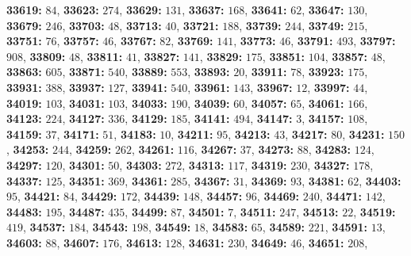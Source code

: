 \textsf{\bfseries 33619:} $84$, \textsf{\bfseries 33623:} $274$, \textsf{\bfseries 33629:} $131$, \textsf{\bfseries 33637:} $168$, \textsf{\bfseries 33641:} $62$, \textsf{\bfseries 33647:} $130$, \textsf{\bfseries 33679:} $246$, \textsf{\bfseries 33703:} $48$, \textsf{\bfseries 33713:} $40$, \textsf{\bfseries 33721:} $188$, \textsf{\bfseries 33739:} $244$, \textsf{\bfseries 33749:} $215$, \textsf{\bfseries 33751:} $76$, \textsf{\bfseries 33757:} $46$, \textsf{\bfseries 33767:} $82$, \textsf{\bfseries 33769:} $141$, \textsf{\bfseries 33773:} $46$, \textsf{\bfseries 33791:} $493$, \textsf{\bfseries 33797:} $908$, \textsf{\bfseries 33809:} $48$, \textsf{\bfseries 33811:} $41$, \textsf{\bfseries 33827:} $141$, \textsf{\bfseries 33829:} $175$, \textsf{\bfseries 33851:} $104$, \textsf{\bfseries 33857:} $48$, \textsf{\bfseries 33863:} $605$, \textsf{\bfseries 33871:} $540$, \textsf{\bfseries 33889:} $553$, \textsf{\bfseries 33893:} $20$, \textsf{\bfseries 33911:} $78$, \textsf{\bfseries 33923:} $175$, \textsf{\bfseries 33931:} $388$, \textsf{\bfseries 33937:} $127$, \textsf{\bfseries 33941:} $540$, \textsf{\bfseries 33961:} $143$, \textsf{\bfseries 33967:} $12$, \textsf{\bfseries 33997:} $44$, \textsf{\bfseries 34019:} $103$, \textsf{\bfseries 34031:} $103$, \textsf{\bfseries 34033:} $190$, \textsf{\bfseries 34039:} $60$, \textsf{\bfseries 34057:} $65$, \textsf{\bfseries 34061:} $166$, \textsf{\bfseries 34123:} $224$, \textsf{\bfseries 34127:} $336$, \textsf{\bfseries 34129:} $185$, \textsf{\bfseries 34141:} $494$, \textsf{\bfseries 34147:} $3$, \textsf{\bfseries 34157:} $108$, \textsf{\bfseries 34159:} $37$, \textsf{\bfseries 34171:} $51$, \textsf{\bfseries 34183:} $10$, \textsf{\bfseries 34211:} $95$, \textsf{\bfseries 34213:} $43$, \textsf{\bfseries 34217:} $80$, \textsf{\bfseries 34231:} $150$, \textsf{\bfseries 34253:} $244$, \textsf{\bfseries 34259:} $262$, \textsf{\bfseries 34261:} $116$, \textsf{\bfseries 34267:} $37$, \textsf{\bfseries 34273:} $88$, \textsf{\bfseries 34283:} $124$, \textsf{\bfseries 34297:} $120$, \textsf{\bfseries 34301:} $50$, \textsf{\bfseries 34303:} $272$, \textsf{\bfseries 34313:} $117$, \textsf{\bfseries 34319:} $230$, \textsf{\bfseries 34327:} $178$, \textsf{\bfseries 34337:} $125$, \textsf{\bfseries 34351:} $369$, \textsf{\bfseries 34361:} $285$, \textsf{\bfseries 34367:} $31$, \textsf{\bfseries 34369:} $93$, \textsf{\bfseries 34381:} $62$, \textsf{\bfseries 34403:} $95$, \textsf{\bfseries 34421:} $84$, \textsf{\bfseries 34429:} $172$, \textsf{\bfseries 34439:} $148$, \textsf{\bfseries 34457:} $96$, \textsf{\bfseries 34469:} $240$, \textsf{\bfseries 34471:} $142$, \textsf{\bfseries 34483:} $195$, \textsf{\bfseries 34487:} $435$, \textsf{\bfseries 34499:} $87$, \textsf{\bfseries 34501:} $7$, \textsf{\bfseries 34511:} $247$, \textsf{\bfseries 34513:} $22$, \textsf{\bfseries 34519:} $419$, \textsf{\bfseries 34537:} $184$, \textsf{\bfseries 34543:} $198$, \textsf{\bfseries 34549:} $18$, \textsf{\bfseries 34583:} $65$, \textsf{\bfseries 34589:} $221$, \textsf{\bfseries 34591:} $13$, \textsf{\bfseries 34603:} $88$, \textsf{\bfseries 34607:} $176$, \textsf{\bfseries 34613:} $128$, \textsf{\bfseries 34631:} $230$, \textsf{\bfseries 34649:} $46$, \textsf{\bfseries 34651:} $208$, 
